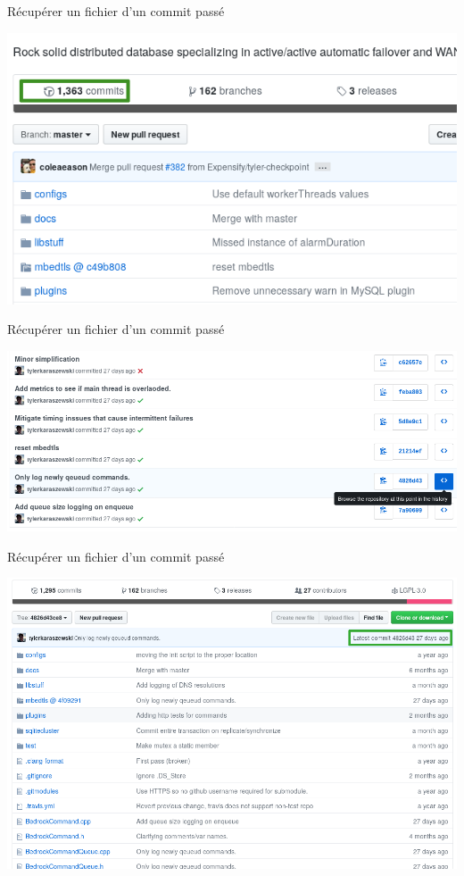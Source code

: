 \documentclass{beamer}
\begin{document}
\begin{frame}{Récupérer un fichier d'un commit passé}
    \begin{center}
    	\includegraphics[scale=0.5]{img/rollback_1.png}
    \end{center}
\end{frame}

\begin{frame}{Récupérer un fichier d'un commit passé}
    \begin{center}
    	\includegraphics[scale=0.3]{img/rollback_2.png}
    \end{center}
\end{frame}

\begin{frame}{Récupérer un fichier d'un commit passé}
    \begin{center}
    	\includegraphics[scale=0.3]{img/rollback_3.png}
    \end{center}
\end{frame}
\end{document}

